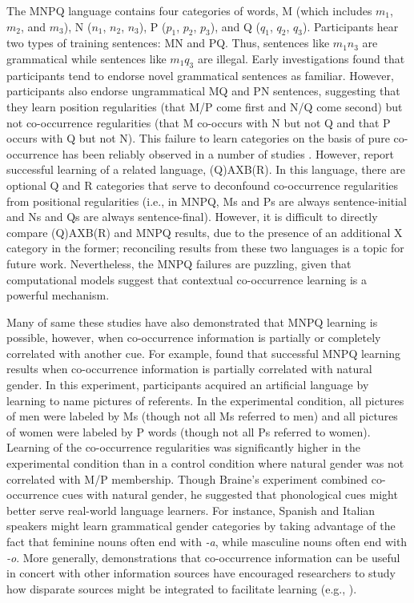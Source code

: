 \documentclass[man,floatsintext]{apa6}
\begin{document}
The MNPQ language contains four categories of words, M (which includes $m_1$, $m_2$, and $m_3$), N ($n_1$, $n_2$, $n_3$), P ($p_1$, $p_2$, $p_3$), and Q ($q_1$, $q_2$, $q_3$). Participants hear two types of training sentences: MN and PQ. Thus, sentences like $m_1 n_3$ are grammatical while sentences like $m_1 q_3$ are illegal. Early investigations \citep{braine1966, smith1966} found that participants tend to endorse novel grammatical sentences as familiar. However, participants also endorse ungrammatical MQ and PN sentences, suggesting that they learn position regularities (that M/P come first and N/Q come second) but not co-occurrence regularities (that M co-occurs with N but not Q and that P occurs with Q but not N). This failure to learn categories on the basis of pure co-occurrence has been reliably observed in a number of studies \citep{braine1987, brooks1993, frigo1998, kempe2001, gerken2005, lany2010, frank2011}. However, \citet[Experiment 5]{reeder2009} report successful learning of a related language, (Q)AXB(R). In this language, there are optional Q and R categories that serve to deconfound co-occurrence regularities from positional regularities (i.e., in MNPQ, Ms and Ps are always sentence-initial and Ns and Qs are always sentence-final). However, it is difficult to directly compare (Q)AXB(R) and MNPQ results, due to the presence of an additional X category in the former; reconciling results from these two languages is a topic for future work. Nevertheless, the MNPQ failures are puzzling, given that computational models suggest that contextual co-occurrence learning is a powerful mechanism.

Many of same these studies have also demonstrated that MNPQ learning is possible, however, when co-occurrence information is partially or completely correlated with another cue. For example, \citet{braine1987} found that successful MNPQ learning results when co-occurrence information is partially correlated with natural gender. In this experiment, participants acquired an artificial language by learning to name pictures of referents. In the experimental condition, all pictures of men were labeled by Ms (though not all Ms referred to men) and all pictures of women were labeled by P words (though not all Ps referred to women). Learning of the co-occurrence regularities was significantly higher in the experimental condition than in a control condition where natural gender was not correlated with M/P membership. Though Braine's experiment combined co-occurrence cues with natural gender, he suggested that phonological cues might better serve real-world language learners. For instance, Spanish and Italian speakers might learn grammatical gender categories by taking advantage of the fact that feminine nouns often end with \emph{-a}, while masculine nouns often end with \emph{-o}. More generally, demonstrations that co-occurrence information can be useful in concert with other information sources have encouraged researchers to study how disparate sources might be integrated to facilitate learning (e.g., \citealp{monaghan2005, johns2012}).
\end{document}
